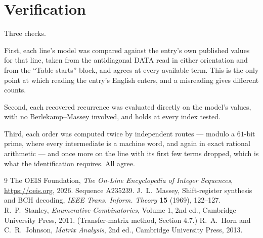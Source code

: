 \documentclass[11pt,a4paper]{article}
\theoremstyle{plain}
\theoremstyle{definition}
\begin{document}
\section{Verification}

Three checks.

First, each line's model was compared against the entry's own published values for that line,
taken from the antidiagonal DATA read in either orientation and from the ``Table starts''
block, and agrees at every available term. This is the only point at which reading the entry's
English enters, and a misreading gives different counts.

Second, each recovered recurrence was evaluated directly on the model's values, with no
Berlekamp--Massey involved, and holds at every index tested.

Third, each order was computed twice by independent routes --- modulo a $61$-bit prime, where
every intermediate is a machine word, and again in exact rational arithmetic --- and once more
on the line with its first few terms dropped, which is what the identification requires. All
agree.

\begin{thebibliography}{9}
 The OEIS Foundation, \emph{The On-Line Encyclopedia of Integer
Sequences}, \url{https://oeis.org}, 2026. Sequence A235239.
 J.~L.~Massey, Shift-register synthesis and BCH decoding, \emph{IEEE
Trans. Inform. Theory} \textbf{15} (1969), 122--127.
 R.~P.~Stanley, \emph{Enumerative Combinatorics}, Volume 1, 2nd ed.,
Cambridge University Press, 2011. (Transfer-matrix method, Section 4.7.)
 R.~A.~Horn and C.~R.~Johnson, \emph{Matrix Analysis}, 2nd ed., Cambridge
University Press, 2013.
\end{thebibliography}
\end{document}
